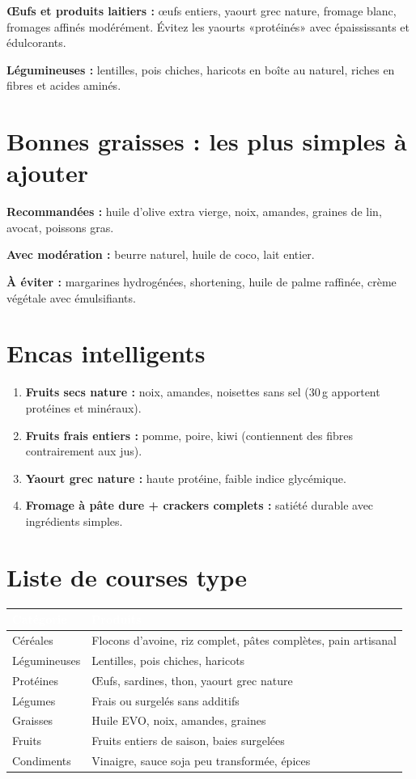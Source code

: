 \documentclass[a5paper,12pt,oneside,openany]{book}
\begin{document}
\textbf{Œufs et produits laitiers :} œufs entiers, yaourt grec nature, fromage
blanc, fromages affinés modérément. Évitez les yaourts «protéinés» avec
épaississants et édulcorants.

\textbf{Légumineuses :} lentilles, pois chiches, haricots en boîte au naturel,
riches en fibres et acides aminés.

\section{Bonnes graisses : les plus simples à ajouter}

\textbf{Recommandées :} huile d'olive extra vierge, noix, amandes, graines de
lin, avocat, poissons gras.

\textbf{Avec modération :} beurre naturel, huile de coco, lait entier.

\textbf{À éviter :} margarines hydrogénées, shortening, huile de palme
raffinée, crème végétale avec émulsifiants.

\section{Encas intelligents}

\begin{enumerate}
  \item \textbf{Fruits secs nature :} noix, amandes, noisettes sans sel
    (30\,g apportent protéines et minéraux).
  \item \textbf{Fruits frais entiers :} pomme, poire, kiwi (contiennent des
    fibres contrairement aux jus).
  \item \textbf{Yaourt grec nature :} haute protéine, faible indice glycémique.
  \item \textbf{Fromage à pâte dure + crackers complets :} satiété durable
    avec ingrédients simples.
\end{enumerate}

\section{Liste de courses type}

{\small
\begin{tabularx}{\textwidth}{|l|L|}
\hline
{}
  \textcolor{white}{\textbf{Catégorie}}
  & \textcolor{white}{\textbf{Produits}} \\
\hline
Céréales & Flocons d'avoine, riz complet, pâtes complètes, pain artisanal \\
\hline
Légumineuses & Lentilles, pois chiches, haricots \\
\hline
Protéines & Œufs, sardines, thon, yaourt grec nature \\
\hline
Légumes & Frais ou surgelés sans additifs \\
\hline
Graisses & Huile EVO, noix, amandes, graines \\
\hline
Fruits & Fruits entiers de saison, baies surgelées \\
\hline
Condiments & Vinaigre, sauce soja peu transformée, épices \\
\hline
\end{tabularx}
}
\end{document}
